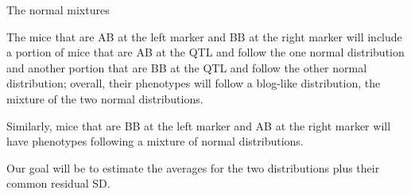 \documentclass[aspectratio=169,12pt,t]{beamer}
\begin{document}
\begin{frame}{The normal mixtures}
{  The mice that are AB at the left marker and BB at the right marker
  will include a portion of mice that are AB at the QTL and follow the
  one normal distribution and another portion that are BB at the QTL
  and follow the other normal distribution; overall, their phenotypes
  will follow a blog-like distribution, the mixture of the two normal
  distributions.

  Similarly, mice that are BB at the left marker and AB at the right
  marker will have phenotypes following a mixture of normal
  distributions.

  Our goal will be to estimate the averages for the two distributions
  plus their common residual SD.
}


\end{frame}
\end{document}
